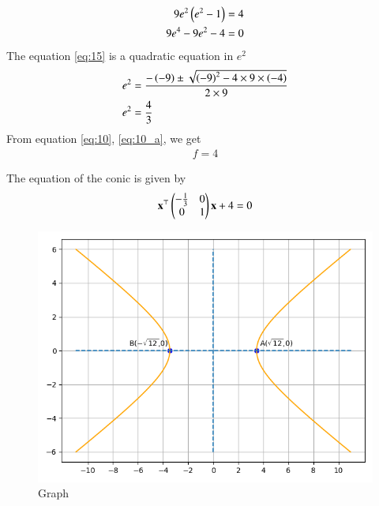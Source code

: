 \documentclass[journal,12pt,twocolumn]{IEEEtran}
\begin{document}
\begin{enumerate}
\begin{enumerate}
\begin{align}
9e^2\left(e^2-1\right) &= 4\\
9e^4-9e^2-4 &= 0
\label{eq:15}
\end{align}
The equation \eqref{eq:15} is a quadratic equation in $e^2$
\begin{align}
e^2 &= \frac{-\left(-9\right)\pm\sqrt{\left(-9\right)^2-4\times9\times\left(-4\right)}}{2\times9}\\
e^2 &= \frac{4}{3}
\end{align}
From equation \eqref{eq:10}, \eqref{eq:10_a}, we get
\begin{align}
f = 4
\end{align} 
\end{enumerate}
The equation of the conic is given by
\begin{align}
\mathbf{x}^\top\begin{pmatrix}-\frac{1}{3}&0\\0&1\end{pmatrix}\mathbf{x} +4 = 0
\end{align}
\begin{figure}[ht]
\centering
\includegraphics[width = \columnwidth]{"./figs/fig1.png"}
\caption{Graph}
\label{fig:1}
\end{figure}
\begin{table}[h]
\centering

\caption{}
\label{tab:1}
\end{table}
\end{enumerate}
\end{document}
